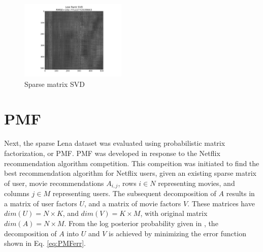 \documentclass[journal]{IEEEtran}
\begin{document}
\begin{figure}[h!]
\centering
    \includegraphics[width=0.45\textwidth]{sparsesvd.png}
    \caption{Sparse matrix SVD}
    \label{fig:sparseSVD}
\end{figure}

\section{PMF}
Next, the sparse Lena dataset was evaluated using probabilistic matrix factorization, or PMF. PMF was developed in response to the Netflix
recommendation algorithm competition. This compeition was initiated to find the best recommendation algorithm for Netflix users, 
given an existing sparse matrix of user, movie recommendations \begin{math}A_{i,j}\end{math}, rows \begin{math}i \in N\end{math} representing movies, 
and columns \begin{math}j \in M\end{math}
representing users. The subsequent decomposition of \begin{math}A\end{math} results in a matrix of user factors \begin{math}U\end{math}, and a matrix of
movie factors \begin{math}V\end{math}. These matrices have \begin{math}dim(U) = N \times K \end{math}, and \begin{math}dim(V) = K \times M\end{math},
with original matrix \begin{math}dim(A) = N \times M\end{math}. From the log posterior probability given in \cite{PMFpaper}, the decomposition of
\begin{math}A\end{math} into \begin{math}U\end{math} and \begin{math}V\end{math} is achieved by minimizing the error function shown in Eq. \ref{eq:PMFerr}.
\end{document}
